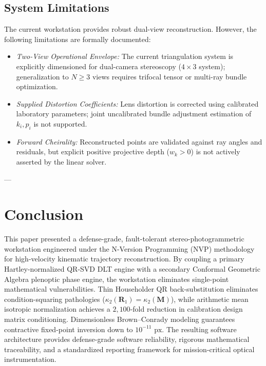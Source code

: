 \documentclass[journal]{IEEEtran}
\begin{document}
\subsection{System Limitations}
The current workstation provides robust dual-view reconstruction. However, the following limitations are formally documented:
\begin{itemize}
    \item \textit{Two-View Operational Envelope:} The current triangulation system is explicitly dimensioned for dual-camera stereoscopy ($4 \times 3$ system); generalization to $N \ge 3$ views requires trifocal tensor or multi-ray bundle optimization.
    \item \textit{Supplied Distortion Coefficients:} Lens distortion is corrected using calibrated laboratory parameters; joint uncalibrated bundle adjustment estimation of $k_i, p_i$ is not supported.
    \item \textit{Forward Cheirality:} Reconstructed points are validated against ray angles and residuals, but explicit positive projective depth ($w_k > 0$) is not actively asserted by the linear solver.
\end{itemize}

---

\section{Conclusion}
This paper presented a defense-grade, fault-tolerant stereo-photogrammetric workstation engineered under the N-Version Programming (NVP) methodology for high-velocity kinematic trajectory reconstruction. By coupling a primary Hartley-normalized QR-SVD DLT engine with a secondary Conformal Geometric Algebra plenoptic phase engine, the workstation eliminates single-point mathematical vulnerabilities. Thin Householder QR back-substitution eliminates condition-squaring pathologies ($\kappa_2(\mathbf{R}_1) = \kappa_2(\mathbf{M})$), while arithmetic mean isotropic normalization achieves a $2,100$-fold reduction in calibration design matrix conditioning. Dimensionless Brown--Conrady modeling guarantees contractive fixed-point inversion down to $10^{-11}\text{ px}$. The resulting software architecture provides defense-grade software reliability, rigorous mathematical traceability, and a standardized reporting framework for mission-critical optical instrumentation.
\end{document}
